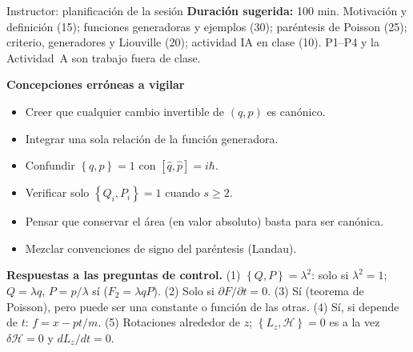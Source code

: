 \documentclass[spanish]{beamer}
\newcommand{\Ham}{\mathcal{H}}               %
\newcommand{\pb}[2]{\left\{#1,#2\right\}}    %
\begin{document}
\begin{frame}{Instructor: planificación de la sesión}
\small
\textbf{Duración sugerida:} 100 min.
Motivación y definición (15); funciones generadoras y ejemplos (30);
paréntesis de Poisson (25); criterio, generadores y Liouville (20);
actividad IA en clase (10). P1--P4 y la Actividad~A son trabajo fuera de clase.

\medskip
\textbf{Concepciones erróneas a vigilar}
\begin{itemize}
  \item Creer que cualquier cambio invertible de $(q,p)$ es canónico.
  \item Integrar una sola relación de la función generadora.
  \item Confundir $\pb{q}{p}=1$ con $[\hat q,\hat p]=i\hbar$.
  \item Verificar solo $\pb{Q_i}{P_i}=1$ cuando $s\ge2$.
  \item Pensar que conservar el área (en valor absoluto) basta para ser canónica.
  \item Mezclar convenciones de signo del paréntesis (Landau).
\end{itemize}

\medskip
\textbf{Respuestas a las preguntas de control.}
(1) $\pb{Q}{P}=\lambda^2$: solo si $\lambda^2=1$; $Q=\lambda q$, $P=p/\lambda$ sí
($F_2=\lambda qP$).
(2) Solo si $\partial F/\partial t=0$.
(3) Sí (teorema de Poisson), pero puede ser una constante o función de las otras.
(4) Sí, si depende de $t$: $f=x-pt/m$.
(5) Rotaciones alrededor de $z$; $\pb{L_z}{\Ham}=0$ es a la vez $\delta\Ham=0$ y $dL_z/dt=0$.
\end{frame}
\end{document}
